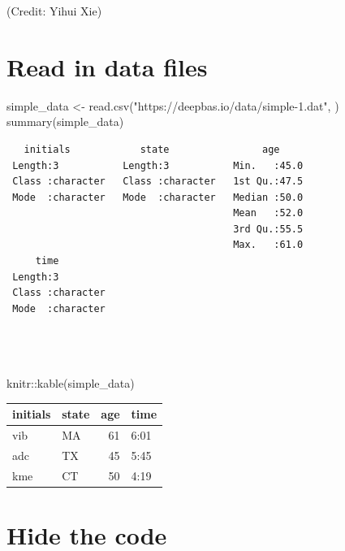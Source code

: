 \documentclass[
]{book}
\newenvironment{Shaded}{\begin{snugshade}}{\end{snugshade}}
\newcommand{\FunctionTok}[1]{\textcolor[rgb]{0.00,0.00,0.00}{#1}}
\newcommand{\NormalTok}[1]{#1}
\newcommand{\OtherTok}[1]{\textcolor[rgb]{0.56,0.35,0.01}{#1}}
\newcommand{\SpecialCharTok}[1]{\textcolor[rgb]{0.00,0.00,0.00}{#1}}
\newcommand{\StringTok}[1]{\textcolor[rgb]{0.31,0.60,0.02}{#1}}
\begin{document}
(Credit: Yihui Xie)

\hypertarget{read-in-data-files}{%
\section{Read in data files}\label{read-in-data-files}}

\begin{Shaded}
\begin{Highlighting}[]
\NormalTok{simple\_data }\OtherTok{\textless{}{-}} \FunctionTok{read.csv}\NormalTok{(}\StringTok{"https://deepbas.io/data/simple{-}1.dat"}\NormalTok{, )}
\FunctionTok{summary}\NormalTok{(simple\_data) }
\end{Highlighting}
\end{Shaded}

\begin{verbatim}
   initials            state                age      
 Length:3           Length:3           Min.   :45.0  
 Class :character   Class :character   1st Qu.:47.5  
 Mode  :character   Mode  :character   Median :50.0  
                                       Mean   :52.0  
                                       3rd Qu.:55.5  
                                       Max.   :61.0  
     time          
 Length:3          
 Class :character  
 Mode  :character  
                   
                   
                   
\end{verbatim}

\begin{Shaded}
\begin{Highlighting}[]
\NormalTok{knitr}\SpecialCharTok{::}\FunctionTok{kable}\NormalTok{(simple\_data)}
\end{Highlighting}
\end{Shaded}

\begin{tabular}{l|l|r|l}
\hline
initials & state & age & time\\
\hline
vib & MA & 61 & 6:01\\
\hline
adc & TX & 45 & 5:45\\
\hline
kme & CT & 50 & 4:19\\
\hline
\end{tabular}

\hypertarget{hide-the-code}{%
\section{Hide the code}\label{hide-the-code}}
\end{document}
